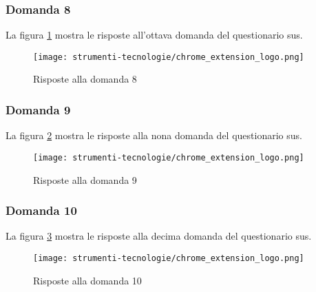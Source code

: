 \subsubsection*{Domanda 8}

\vspace{5pt}
\begin{minipage}{\textwidth}
  \par\noindent La figura \ref{fig:sus_q8} mostra le risposte all'ottava domanda del questionario \gls{sus}.
  \begin{figure}[H]
    \centering
    \texttt{[image: strumenti-tecnologie/chrome\_extension\_logo.png]} 
    \caption{Risposte alla domanda 8}
    \label{fig:sus_q8}
  \end{figure}
\end{minipage}

\subsubsection*{Domanda 9}

\vspace{5pt}
\begin{minipage}{\textwidth}
  \par\noindent La figura \ref{fig:sus_q9} mostra le risposte alla nona domanda del questionario \gls{sus}.
  \begin{figure}[H]
    \centering
    \texttt{[image: strumenti-tecnologie/chrome\_extension\_logo.png]} 
    \caption{Risposte alla domanda 9}
    \label{fig:sus_q9}
  \end{figure}
\end{minipage}

\subsubsection*{Domanda 10}

\vspace{5pt}
\begin{minipage}{\textwidth}
  \par\noindent La figura \ref{fig:sus_q10} mostra le risposte alla decima domanda del questionario \gls{sus}.
  \begin{figure}[H]
    \centering
    \texttt{[image: strumenti-tecnologie/chrome\_extension\_logo.png]} 
    \caption{Risposte alla domanda 10}
    \label{fig:sus_q10}
  \end{figure}
\end{minipage}


